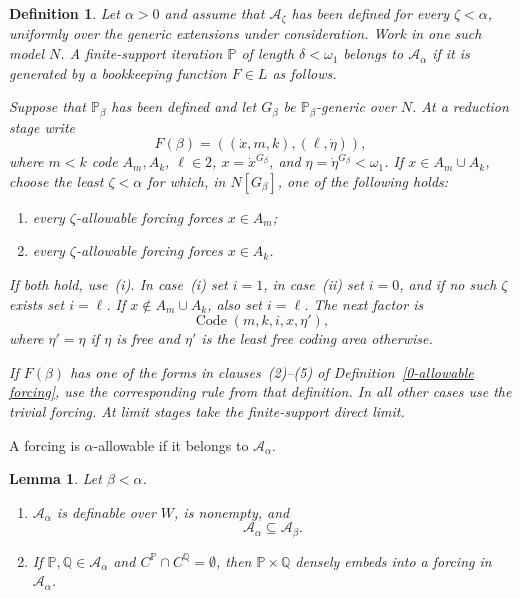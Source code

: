 \documentclass[a4paper,11pt]{article}
\newtheorem{lemma}[theorem]{Lemma}
\newtheorem{definition}[theorem]{Definition}
\newcommand{\forceP}{\mathbb{P}}
\newcommand{\forceQ}{\mathbb{Q}}
\begin{document}
\begin{definition}\label{AlphaAllowable}
Let $\alpha>0$ and assume that $\mathcal A_\zeta$ has been defined for every $\zeta<\alpha$, uniformly over the generic extensions under consideration. Work in one such model $N$. A finite-support iteration $\forceP$ of length $\delta<\omega_1$ belongs to $\mathcal A_\alpha$ if it is generated by a bookkeeping function $F\in L$ as follows.

Suppose that $\forceP_\beta$ has been defined and let $G_\beta$ be $\forceP_\beta$-generic over $N$. At a reduction stage write
\[
F(\beta)=((\dot x,m,k),(\ell,\dot\eta)),
\]
where $m<k$ code $A_m,A_k$, $\ell\in2$, $x=\dot x^{G_\beta}$, and $\eta=\dot\eta^{G_\beta}<\omega_1$. If $x\in A_m\cup A_k$, choose the least $\zeta<\alpha$ for which, in $N[G_\beta]$, one of the following holds:
\begin{enumerate}
\item[(i)] every $\zeta$-allowable forcing forces $x\in A_m$;
\item[(ii)] every $\zeta$-allowable forcing forces $x\in A_k$.
\end{enumerate}
If both hold, use~(i). In case~(i) set $i=1$, in case~(ii) set $i=0$, and if no such $\zeta$ exists set $i=\ell$. If $x\notin A_m\cup A_k$, also set $i=\ell$. The next factor is
\[
\operatorname{Code}(m,k,i,x,\eta'),
\]
where $\eta'=\eta$ if $\eta$ is free and $\eta'$ is the least free coding area otherwise.

If $F(\beta)$ has one of the forms in clauses~(2)--(5) of Definition~\ref{0-allowable forcing}, use the corresponding rule from that definition. In all other cases use the trivial forcing. At limit stages take the finite-support direct limit.
\end{definition}

A forcing is $\alpha$-allowable if it belongs to $\mathcal A_\alpha$.

\begin{lemma}\label{AllowableDerivativeProperties}
Let $\beta<\alpha$.
\begin{enumerate}
\item $\mathcal A_\alpha$ is definable over $W$, is nonempty, and
\[
\mathcal A_\alpha\subseteq\mathcal A_\beta.
\]
\item If $\forceP,\forceQ\in\mathcal A_\alpha$ and $C^{\forceP}\cap C^{\forceQ}=\emptyset$, then $\forceP\times\forceQ$ densely embeds into a forcing in $\mathcal A_\alpha$.
\end{enumerate}
\end{lemma}
\end{document}
